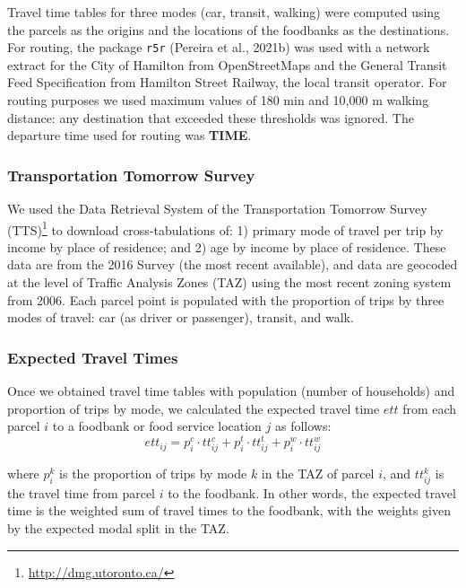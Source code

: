 \documentclass[]{elsarticle} %
\begin{document}
Travel time tables for three modes (car, transit, walking) were computed
using the parcels as the origins and the locations of the foodbanks as
the destinations. For routing, the package \texttt{r5r} (Pereira et al.,
2021b) was used with a network extract for the City of Hamilton from
OpenStreetMaps and the General Transit Feed Specification from Hamilton
Street Railway, the local transit operator. For routing purposes we used
maximum values of 180 min and 10,000 m walking distance: any destination
that exceeded these thresholds was ignored. The departure time used for
routing was \textbf{TIME}.

\hypertarget{transportation-tomorrow-survey}{%
\subsubsection{Transportation Tomorrow
Survey}\label{transportation-tomorrow-survey}}

We used the Data Retrieval System of the Transportation Tomorrow Survey
(TTS)\footnote{\url{http://dmg.utoronto.ca/}} to download
cross-tabulations of: 1) primary mode of travel per trip by income by
place of residence; and 2) age by income by place of residence. These
data are from the 2016 Survey (the most recent available), and data are
geocoded at the level of Traffic Analysis Zones (TAZ) using the most
recent zoning system from 2006. Each parcel point is populated with the
proportion of trips by three modes of travel: car (as driver or
passenger), transit, and walk.

\hypertarget{expected-travel-times}{%
\subsubsection{Expected Travel Times}\label{expected-travel-times}}

Once we obtained travel time tables with population (number of
households) and proportion of trips by mode, we calculated the expected
travel time \(ett\) from each parcel \(i\) to a foodbank or food service
location \(j\) as follows: \[
ett_{ij} = p^c_i\cdot tt^c_{ij} + p^t_i\cdot tt^t_{ij} + p^w_i\cdot tt^w_{ij}
\]

\noindent where \(p^k_i\) is the proportion of trips by mode \(k\) in
the TAZ of parcel \(i\), and \(tt^k_{ij}\) is the travel time from
parcel \(i\) to the foodbank. In other words, the expected travel time
is the weighted sum of travel times to the foodbank, with the weights
given by the expected modal split in the TAZ.
\end{document}
